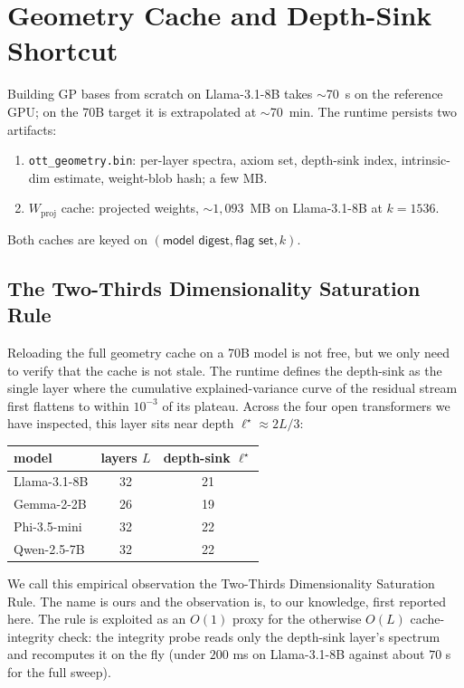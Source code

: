 \documentclass[11pt]{article}
\begin{document}
\section{Geometry Cache and Depth-Sink Shortcut}
\label{sec:cache}
Building GP bases from scratch on Llama-3.1-8B takes $\sim$70~s on the
reference GPU; on the 70B target it is extrapolated at $\sim$70~min.  The
runtime persists two artifacts:
\begin{enumerate}
\item \texttt{ott\_geometry.bin}: per-layer spectra, axiom set, depth-sink
index, intrinsic-dim estimate, weight-blob hash; a few MB.
\item $W_\text{proj}$ cache: projected weights, $\sim 1{,}093$~MB on
Llama-3.1-8B at $k{=}1536$.
\end{enumerate}
Both caches are keyed on $(\textsf{model digest},\textsf{flag set},k)$.

\subsection{The Two-Thirds Dimensionality Saturation Rule}
Reloading the full geometry cache on a 70B model is not free, but we
only need to verify that the cache is not stale. The runtime defines
the depth-sink as the single layer where the cumulative
explained-variance curve of the residual stream first flattens to
within $10^{-3}$ of its plateau. Across the four open transformers we
have inspected, this layer sits near depth $\ell^\star\approx 2L/3$:
\begin{center}\small
\begin{tabular}{lcc}\toprule
model & layers $L$ & depth-sink $\ell^\star$\\\midrule
Llama-3.1-8B   & 32 & 21\\
Gemma-2-2B     & 26 & 19\\
Phi-3.5-mini   & 32 & 22\\
Qwen-2.5-7B    & 32 & 22\\\bottomrule
\end{tabular}\end{center}
We call this empirical observation the Two-Thirds Dimensionality
Saturation Rule. The name is ours and the observation is, to our knowledge,
first reported here. The rule is exploited as an $O(1)$ proxy for the
otherwise $O(L)$ cache-integrity check: the integrity probe reads only the
depth-sink layer's spectrum and recomputes it on the fly (under $200$ ms on
Llama-3.1-8B against about $70$ s for the full sweep).
\end{document}
